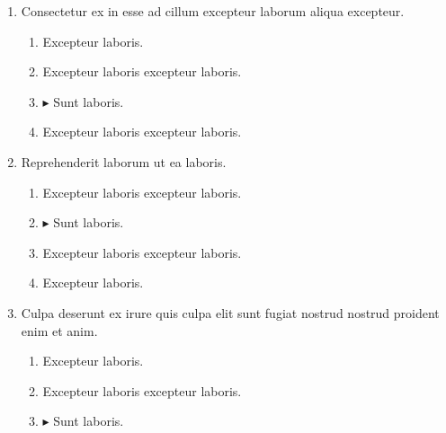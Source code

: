 \documentclass[a4paper,12pt]{article}
\begin{document}
\begin{enumerate}[label=\textbf{\arabic*.}]
\begin{multicols}{2}
\begin{enumerate}
		\item  Excepteur laboris excepteur laboris.
  
	\end{enumerate}

\end{multicols}
\item Consectetur ex in esse ad cillum excepteur laborum aliqua excepteur.
\begin{multicols}{2}
	\begin{enumerate}
		\item  Excepteur laboris.
    
		\item  Excepteur laboris excepteur laboris.
  
		\item $\blacktriangleright$  Sunt laboris.
    
		\item  Excepteur laboris excepteur laboris.
    
	\end{enumerate}

\end{multicols}
\item Reprehenderit laborum ut ea laboris.
\begin{multicols}{2}
	\begin{enumerate}
		\item  Excepteur laboris excepteur laboris.
  
		\item $\blacktriangleright$  Sunt laboris.
    
		\item  Excepteur laboris excepteur laboris.
    
		\item  Excepteur laboris.
    
	\end{enumerate}

\end{multicols}
\item Culpa deserunt ex irure quis culpa elit sunt fugiat nostrud nostrud proident enim et anim.
\begin{multicols}{2}
	\begin{enumerate}
		\item  Excepteur laboris.
    
		\item  Excepteur laboris excepteur laboris.
  
		\item $\blacktriangleright$  Sunt laboris.
    

\end{enumerate}
\end{multicols}
\end{enumerate}
\end{document}
